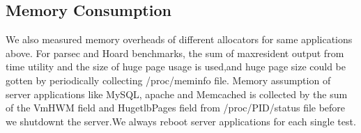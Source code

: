 

\subsection{Memory Consumption}
\label{sec:memory}

We also measured memory overheads of different allocators for same applications above. For parsec and Hoard benchmarks, the sum of maxresident output from time utility and the size of huge page usage is used,and huge page size could be gotten by periodically collecting /proc/meminfo file. Memory assumption of server applications like MySQL, apache and Memcached is collected by the sum of the VmHWM field and HugetlbPages field from /proc/PID/status file before we shutdownt the server.We always reboot server applications for each single test. 

